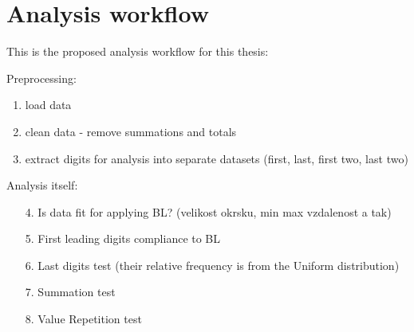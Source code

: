



\section{Analysis workflow}

This is the proposed analysis workflow for this thesis: 


Preprocessing: 

\begin{enumerate}
    \item load data 
    \item clean data - remove summations and totals 
    \item extract digits for analysis into separate datasets (first, last, first two, last two) 
\end{enumerate}

Analysis itself: 

\begin{enumerate}
    \item[4.] Is data fit for applying BL? (velikost okrsku, min max vzdalenost a tak)
    \item[5.] First leading digits compliance to BL
    \item[6.] Last digits test (their relative frequency is from the Uniform distribution)
    \item[7.] Summation test 
    \item[8.] Value Repetition test
\end{enumerate}
